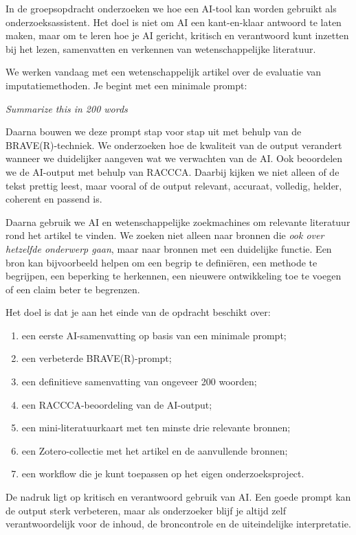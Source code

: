 \documentclass[
  letterpaper,
  DIV=11,
  numbers=noendperiod]{scrreprt}
\providecommand{\tightlist}{%
  \setlength{\itemsep}{0pt}\setlength{\parskip}{0pt}}
\begin{document}
In de groepsopdracht onderzoeken we hoe een AI-tool kan worden gebruikt
als onderzoeksassistent. Het doel is niet om AI een kant-en-klaar
antwoord te laten maken, maar om te leren hoe je AI gericht, kritisch en
verantwoord kunt inzetten bij het lezen, samenvatten en verkennen van
wetenschappelijke literatuur.

We werken vandaag met een wetenschappelijk artikel over de evaluatie van
imputatiemethoden. Je begint met een minimale prompt:

\emph{Summarize this in 200 words}

Daarna bouwen we deze prompt stap voor stap uit met behulp van de
BRAVE(R)-techniek. We onderzoeken hoe de kwaliteit van de output
verandert wanneer we duidelijker aangeven wat we verwachten van de AI.
Ook beoordelen we de AI-output met behulp van RACCCA. Daarbij kijken we
niet alleen of de tekst prettig leest, maar vooral of de output
relevant, accuraat, volledig, helder, coherent en passend is.

Daarna gebruik we AI en wetenschappelijke zoekmachines om relevante
literatuur rond het artikel te vinden. We zoeken niet alleen naar
bronnen die \emph{ook over hetzelfde onderwerp gaan}, maar naar bronnen
met een duidelijke functie. Een bron kan bijvoorbeeld helpen om een
begrip te definiëren, een methode te begrijpen, een beperking te
herkennen, een nieuwere ontwikkeling toe te voegen of een claim beter te
begrenzen.

Het doel is dat je aan het einde van de opdracht beschikt over:

\begin{enumerate}
\def\labelenumi{\arabic{enumi}.}
\tightlist
\item
  een eerste AI-samenvatting op basis van een minimale prompt;
\item
  een verbeterde BRAVE(R)-prompt;
\item
  een definitieve samenvatting van ongeveer 200 woorden;
\item
  een RACCCA-beoordeling van de AI-output;
\item
  een mini-literatuurkaart met ten minste drie relevante bronnen;
\item
  een Zotero-collectie met het artikel en de aanvullende bronnen;
\item
  een workflow die je kunt toepassen op het eigen onderzoeksproject.
\end{enumerate}

De nadruk ligt op kritisch en verantwoord gebruik van AI. Een goede
prompt kan de output sterk verbeteren, maar als onderzoeker blijf je
altijd zelf verantwoordelijk voor de inhoud, de broncontrole en de
uiteindelijke interpretatie.
\end{document}

